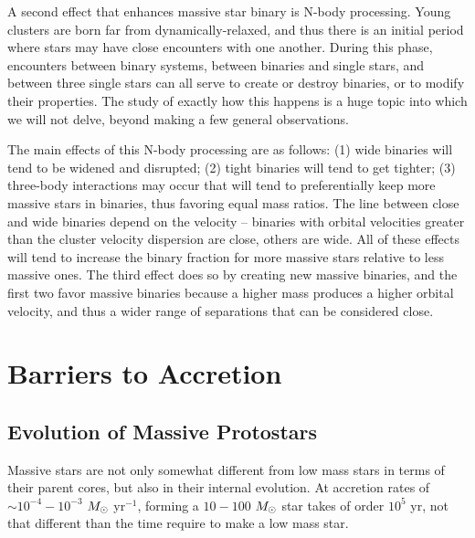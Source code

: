A second effect that enhances massive star binary is N-body processing. Young clusters are born far from dynamically-relaxed, and thus there is an initial period where stars may have close encounters with one another. During this phase, encounters between binary systems, between binaries and single stars, and between three single stars can all serve to create or destroy binaries, or to modify their properties. The study of exactly how this happens is a huge topic into which we will not delve, beyond making a few general observations.

The main effects of this N-body processing are as follows: (1) wide binaries will tend to be widened and disrupted; (2) tight binaries will tend to get tighter; (3) three-body interactions may occur that will tend to preferentially keep more massive stars in binaries, thus favoring equal mass ratios. The line between close and wide binaries depend on the velocity -- binaries with orbital velocities greater than the cluster velocity dispersion are close, others are wide. All of these effects will tend to increase the binary fraction for more massive stars relative to less massive ones. The third effect does so by creating new massive binaries, and the first two favor massive binaries because a higher mass produces a higher orbital velocity, and thus a wider range of separations that can be considered close.

\section{Barriers to Accretion}

\subsection{Evolution of Massive Protostars}

Massive stars are not only somewhat different from low mass stars in terms of their parent cores, but also in their internal evolution. At accretion rates of $\sim 10^{-4}-10^{-3}$ $M_{\odot}$ yr$^{-1}$, forming a $10-100$ $M_{\odot}$ star takes of order $10^5$ yr, not that different than the time require to make a low mass star.

